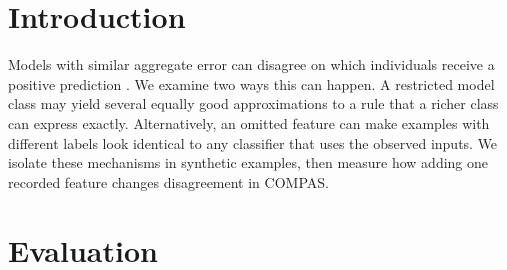 \documentclass{article}
\begin{document}
\printAffiliationsAndNotice{}

\begin{abstract}
Predictive multiplicity occurs when classifiers with similar accuracy disagree on individual predictions. We enumerate prediction patterns in two synthetic experiments and a feature-masking experiment on 6,172 COMPAS records. On XOR, expanding the model family from linear classifiers to depth-two decision trees reduces the number of optimal patterns from four to one. In a separate synthetic experiment with deterministic labels, withholding a relevant feature leaves two optimal tree patterns that disagree on 40\% of the records. In COMPAS, adding a prior-offense indicator raises in-sample optimal accuracy from 58.07\% to 59.95\% and raises ambiguity among patterns within 0.5 percentage points of the optimum from 1.04\% to 53.09\%. The experiments show how feature availability can change individual disagreement even when aggregate accuracy improves.
\end{abstract}

\section{Introduction}

Models with similar aggregate error can disagree on which individuals receive a positive prediction \citep{marx2020}. We examine two ways this can happen. A restricted model class may yield several equally good approximations to a rule that a richer class can express exactly. Alternatively, an omitted feature can make examples with different labels look identical to any classifier that uses the observed inputs. We isolate these mechanisms in synthetic examples, then measure how adding one recorded feature changes disagreement in COMPAS.

\section{Evaluation}
\end{document}
